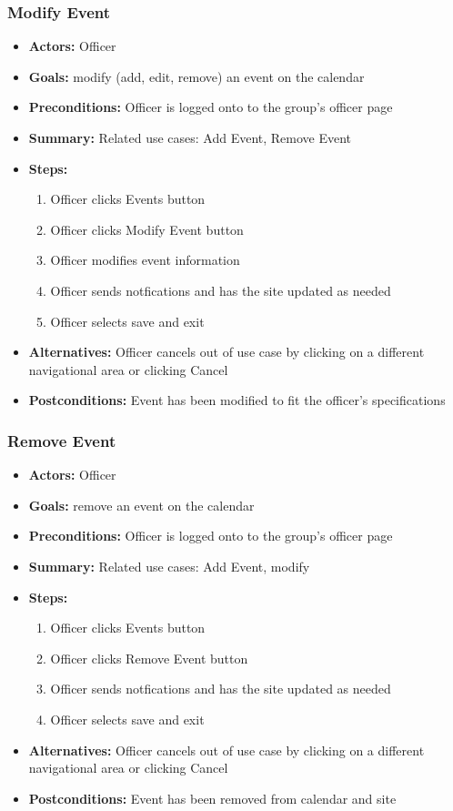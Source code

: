 \documentclass[12pt, oneside, letterpaper]{report}
\begin{document}
		\subsubsection{Modify Event}
			\begin{itemize}
				\item{\textbf{Actors:} Officer}
				\item{\textbf{Goals:} modify (add, edit, remove) an event on the calendar}
				\item{\textbf{Preconditions:} Officer is logged onto to the group's officer page}
				\item{\textbf{Summary:} Related use cases: Add Event, Remove Event}
				\item{\textbf{Steps:}
				\begin{enumerate}
					\item{Officer clicks Events button}
					\item{Officer clicks Modify Event button}
					\item{Officer modifies event information}
					\item{Officer sends notfications and has the site updated as needed}
					\item{Officer selects save and exit}
				\end{enumerate}
				}
				\item{\textbf{Alternatives:} Officer cancels out of use case by clicking on a different navigational area or clicking Cancel}
				\item{\textbf{Postconditions:} Event has been modified to fit the officer's specifications}
			\end{itemize}
			\subsubsection{Remove Event}
			\begin{itemize}
				\item{\textbf{Actors:} Officer}
				\item{\textbf{Goals:} remove an event on the calendar}
				\item{\textbf{Preconditions:} Officer is logged onto to the group's officer page}
				\item{\textbf{Summary:} Related use cases: Add Event, modify}
				\item{\textbf{Steps:}
				\begin{enumerate}
					\item{Officer clicks Events button}
					\item{Officer clicks Remove Event button}
					\item{Officer sends notfications and has the site updated as needed}
					\item{Officer selects save and exit}
				\end{enumerate}
				}
				\item{\textbf{Alternatives:} Officer cancels out of use case by clicking on a different navigational area or clicking Cancel}
				\item{\textbf{Postconditions:} Event has been removed from calendar and site}
			\end{itemize}
\end{document}
